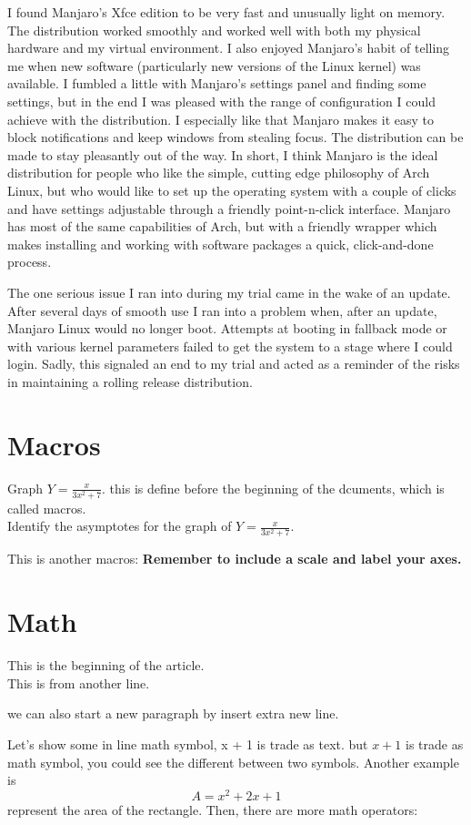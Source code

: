 \documentclass[11pt]{article}
\theoremstyle{definition}
\def\eq1{Y=\frac{x}{3x^2+7}}
\def\labelaxes{Remember to include a scale and label your axes.}
\begin{document}
I found Manjaro's Xfce edition to be very fast and unusually light on memory. The distribution worked smoothly and worked well with both my physical hardware and my virtual environment. I also enjoyed Manjaro's habit of telling me when new software (particularly new versions of the Linux kernel) was available. I fumbled a little with Manjaro's settings panel and finding some settings, but in the end I was pleased with the range of configuration I could achieve with the distribution. I especially like that Manjaro makes it easy to block notifications and keep windows from stealing focus. The distribution can be made to stay pleasantly out of the way. In short, I think Manjaro is the ideal distribution for people who like the simple, cutting edge philosophy of Arch Linux, but who would like to set up the operating system with a couple of clicks and have settings adjustable through a friendly point-n-click interface. Manjaro has most of the same capabilities of Arch, but with a friendly wrapper which makes installing and working with software packages a quick, click-and-done process.

The one serious issue I ran into during my trial came in the wake of an update. After several days of smooth use I ran into a problem when, after an update, Manjaro Linux would no longer boot. Attempts at booting in fallback mode or with various kernel parameters failed to get the system to a stage where I could login. Sadly, this signaled an end to my trial and acted as a reminder of the risks in maintaining a rolling release distribution.



\section{Macros}
Graph $\eq1$. this is define before the beginning of the dcuments, which is called macros.\\
Identify the asymptotes for the graph of $\eq1$.

This is another macros: \textbf{\labelaxes}

\section{Math}
This is the beginning of the article.\\ This is from another line. 

we can also start a new paragraph by insert extra new line. 

Let's show some in line math symbol, x + 1 is trade as text. but $x + 1$ is trade as math symbol, you could see the different between two symbols. Another example is $$A = x^2 + 2x + 1 $$ represent the area of the rectangle. Then, there are more math operators:
\end{document}
